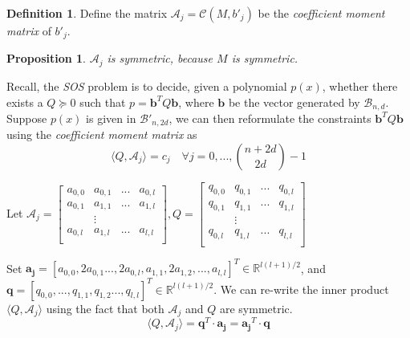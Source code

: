 \documentclass[12pt]{amsart}
\numberwithin{equation}{section}
\newtheorem{prop}[thm]{Proposition}
\theoremstyle{definition}
\newtheorem{definition}[thm]{Definition}
\numberwithin{thm}{section}
\begin{document}
\begin{definition}
Define the matrix $\mathcal{A}_j = \mathcal{C}(M, b'_j)$ be the \emph{coefficient moment matrix} of $b'_j$.
\end{definition}

\begin{prop}
     $\mathcal{A}_j$ is symmetric, because $M$ is symmetric.
\end{prop}

\smallskip
Recall, the \emph{SOS} problem is to decide, given a polynomial $p(x)$, 
whether there exists a $Q \succcurlyeq 0$ such that $p = \mathbf{b}^TQ \mathbf{b}$, where $\mathbf{b}$ be the vector generated by $\mathcal{B}_{n, d}$.
Suppose $p(x)$ is given in $\mathcal{B'}_{n, 2d}$, we can then reformulate the constraints $\mathbf{b}^TQ \mathbf{b}$ using the \emph{coefficient moment matrix} as
\begin{equation}
     \langle Q, \mathcal{A}_j \rangle = c_j \quad \forall j = 0,...,{n + 2d \choose 2d} - 1
\end{equation} 

\smallskip
Let $\mathcal{A}_j = \begin{bmatrix}
               a_{0, 0} & a_{0, 1} & ... &a_{0, l}\\
               a_{0, 1} & a_{1, 1} & ... &a_{1, l} \\
               & \vdots \\
               a_{0, l} & a_{1, l} &... &a_{l, l}\\
     \end{bmatrix}, 
          Q = \begin{bmatrix}
               q_{0, 0} & q_{0, 1} & ... &q_{0, l}\\
               q_{0, 1} & q_{1, 1} & ... &q_{1, l} \\
               & \vdots \\
               q_{0, l} & q_{1, l} &... &q_{l, l}\\
          \end{bmatrix} $

Set $\mathbf{a_j} = [a_{0, 0}, 2a_{0, 1}..., 2a_{0, l}, a_{1, 1}, 2a_{1, 2}, ..., a_{l, l}]^T \in \mathbb{R}^{l(l+1)/2}$, and
$\mathbf{q} = [q_{0, 0}, ...,q_{1,1}, q_{1,2} ..., q_{l, l}]^T \in \mathbb{R}^{l(l+1)/2}$.
We can re-write the inner product $\langle Q, \mathcal{A}_j \rangle$ using the fact that both $\mathcal{A}_j$ and $Q$ are symmetric. \begin{equation*}
     \langle Q, \mathcal{A}_j \rangle = \mathbf{q}^T \cdot \mathbf{a_j} = \mathbf{a_j}^T \cdot \mathbf{q}
\end{equation*}
\end{document}
